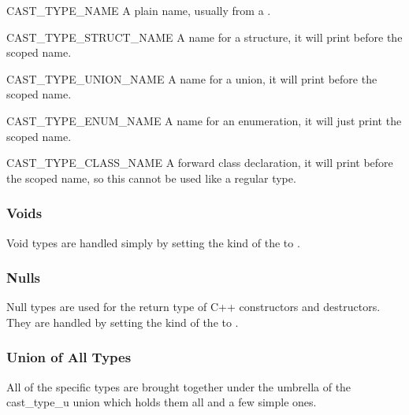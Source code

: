 \begin{cidentifierlist}
  \item[CAST_TYPE_NAME] A plain name, usually from a
  .

  \item[CAST_TYPE_STRUCT_NAME] A name for a structure, it will
  print  before the scoped name.

  \item[CAST_TYPE_UNION_NAME] A name for a union, it will print
   before the scoped name.

  \item[CAST_TYPE_ENUM_NAME] A name for an enumeration, it will
  just print the scoped name.

  \item[CAST_TYPE_CLASS_NAME] A forward class declaration, it will
  print  before the scoped name, so this cannot be used like
  a regular type.
\end{cidentifierlist}

\subsubsection{Voids}

Void types are handled simply by setting the kind of the  to
.

\subsubsection{Nulls}

Null types are used for the return type of C++ constructors and destructors.
They are handled by setting the kind of the  to
.

\subsubsection{Union of All Types}

All of the specific types are brought together under the umbrella of the
cast_type_u union which holds them all and a few simple ones.

